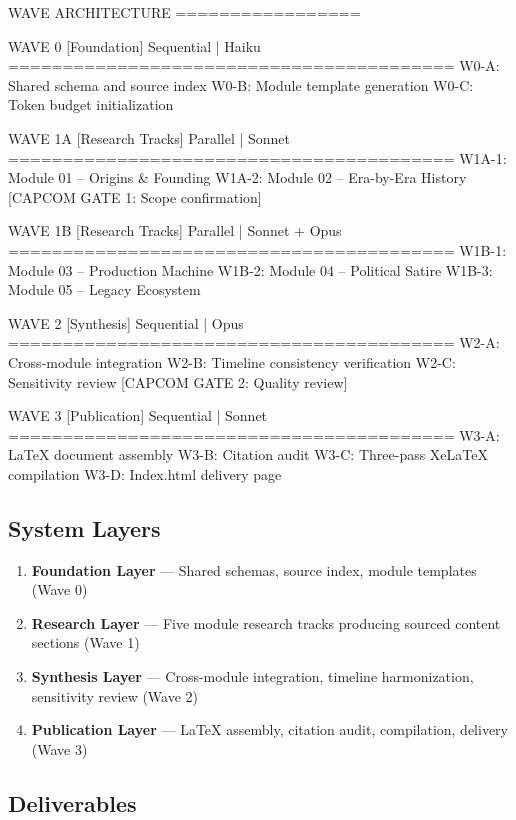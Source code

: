 \documentclass[11pt,letterpaper]{article}
\begin{document}
\begin{asciibox}
WAVE ARCHITECTURE
=================

  WAVE 0 [Foundation]                    Sequential | Haiku
  =========================================
  W0-A: Shared schema and source index
  W0-B: Module template generation
  W0-C: Token budget initialization

  WAVE 1A [Research Tracks]              Parallel | Sonnet
  =========================================
  W1A-1: Module 01 -- Origins & Founding
  W1A-2: Module 02 -- Era-by-Era History
  [CAPCOM GATE 1: Scope confirmation]

  WAVE 1B [Research Tracks]              Parallel | Sonnet + Opus
  =========================================
  W1B-1: Module 03 -- Production Machine
  W1B-2: Module 04 -- Political Satire
  W1B-3: Module 05 -- Legacy Ecosystem

  WAVE 2 [Synthesis]                     Sequential | Opus
  =========================================
  W2-A: Cross-module integration
  W2-B: Timeline consistency verification
  W2-C: Sensitivity review
  [CAPCOM GATE 2: Quality review]

  WAVE 3 [Publication]                   Sequential | Sonnet
  =========================================
  W3-A: LaTeX document assembly
  W3-B: Citation audit
  W3-C: Three-pass XeLaTeX compilation
  W3-D: Index.html delivery page
\end{asciibox}

\subsection{System Layers}

\begin{enumerate}
  \item \textbf{Foundation Layer} --- Shared schemas, source index, module templates (Wave 0)
  \item \textbf{Research Layer} --- Five module research tracks producing sourced content sections (Wave 1)
  \item \textbf{Synthesis Layer} --- Cross-module integration, timeline harmonization, sensitivity review (Wave 2)
  \item \textbf{Publication Layer} --- LaTeX assembly, citation audit, compilation, delivery (Wave 3)
\end{enumerate}

\subsection{Deliverables}
\end{document}
